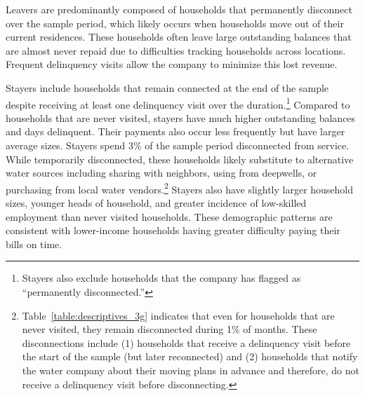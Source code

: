 \documentclass[12pt]{article}
\begin{document}
Leavers are predominantly composed of households that permanently disconnect over the sample period, which likely occurs when households move out of their current residences.  These households often leave large outstanding balances that are almost never repaid due to difficulties tracking households across locations.  Frequent delinquency visits allow the company to minimize this lost revenue.  %

Stayers include households that remain connected at the end of the sample despite receiving at least one delinquency visit over the duration.\footnote{Stayers also exclude households that the company has flagged as ``permanently disconnected.''}  Compared to households that are never visited, stayers have much higher outstanding balances and days delinquent.  Their payments also occur less frequently but have larger average sizes.  Stayers spend 3\% of the sample period disconnected from service.  While temporarily disconnected, these households likely substitute to alternative water sources including sharing with neighbors, using from deepwells, or purchasing from local water vendors.\footnote{Table~\ref{table:descriptives_3g} indicates that even for households that are never visited, they remain disconnected during 1\% of months.  These disconnections include (1) households that receive a delinquency visit before the start of the sample (but later reconnected) and (2) households that notify the water company about their moving plans in advance and therefore, do not receive a delinquency visit before disconnecting.}  Stayers also have slightly larger household sizes, younger heads of household, and greater incidence of low-skilled employment than never visited households.  These demographic patterns are consistent with lower-income households having greater difficulty paying their bills on time.
\end{document}

